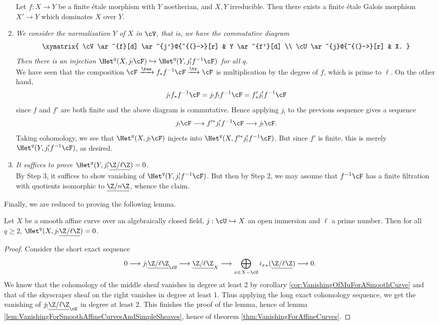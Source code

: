 \begin{enumerate}[\it Step 1.]
\begin{exo}
Let $f: X \to Y$ be a finite \'etale morphism with $Y$ noetherian, and $X, Y$ irreducible. Then there exists a finite \'etale Galois morphism $X' \to Y$ which dominates $X$ over $Y$.
\end{exo}
\item
{\it We consider the normalization $Y$ of $X$ in $\cV$, that is, we have the commutative diagram
$$
\xymatrix{
\cV \ar^{f}[d] \ar^{j'}@{^{(}->}[r] & Y \ar^{f'}[d] \\
\cU \ar^{j}@{^{(}->}[r] & X.
}
$$
Then there is an injection $\Het^q(X, j_!\cF) \hookrightarrow \Het^q(Y, j'_! f^{-1} \cF)$ for all $q$.}
\\
We have seen that the composition $\cF \xrightarrow{\res} f_* f^{-1} \cF \xrightarrow{\tr} \cF$ is multiplication by the degree of $f$, which is prime to $\ell$. On the other hand, 
$$
j_! f_* f^{-1} \cF = j_! f_! f^{-1} \cF = f'_* j'_! f^{-1}\cF
$$ 
since $f$ and $f'$ are both finite and the above diagram is commutative. Hence applying $j_!$ to the previous sequence gives a sequence
$$
j_! \cF \longrightarrow f'^* j'_! f^{-1} \cF \longrightarrow j_! \cF.
$$
Taking cohomology,  we see that  $\Het^q(X, j_!\cF)$ injects into $\Het^q( X , f'^* j'_! f^{-1} \cF)$. But since $f'$ is finite, this is merely $\Het^q( Y,  j'_! f^{-1} \cF)$, as desired.
\item
{\it It suffices to prove $\Het^q (Y, j'_! \underline{\Z/\ell\Z}) = 0$.}
\\
By Step 3, it suffices to show vanishing of $\Het^q( Y,  j'_! f^{-1} \cF)$. But then by Step 2, we may assume that $f^{-1}\cF$ has a finite filtration with quotients isomorphic to $\underline{\Z/n\Z}$, whence the claim.
\end{enumerate}

Finally, we are reduced to proving the following lemma.

\begin{lem} 
Let $X$ be a smooth affine curve over an algebraically closed field, $j: \cU \hookrightarrow X$ an open immersion and $\ell$ a prime number. Then for all $q \geqslant 2$, $\Het^q(X, j_! \underline{\Z/\ell\Z}) = 0$.
\end{lem}

\begin{proof}
Consider the short exact sequence
$$
0 \longrightarrow j_!\underline{\Z/\ell\Z}_\cU \longrightarrow \underline{\Z/\ell\Z}_X \longrightarrow \bigoplus_{x \in X-\cU} {i_x}_*(\underline{\Z/\ell\Z}) \longrightarrow 0.
$$
We know that the cohomology of the middle sheaf vanishes in degree at least 2 by corollary \ref{cor:VanishingOfMuForASmoothCurve} and that of the skyscraper sheaf on the right vanishes in degree at least 1. Thus applying the long exact cohomology sequence, we get the vanishing of $j_!\underline{\Z/\ell\Z}_\cU$ in degree at least 2. This finishes the proof of the lemma, hence of lemma \ref{lem:VanishingForSmoothAffineCurvesAndSimpleSheaves}, hence of theorem \ref{thm:VanishingForAffineCurves}.
\end{proof}

